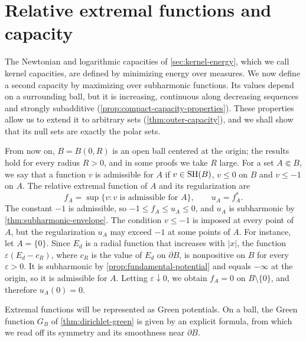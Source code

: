 \section{Relative extremal functions and capacity}
\label{sec:relative-capacity}
The Newtonian and logarithmic capacities of \cref{sec:kernel-energy}, which we call kernel capacities, are defined by minimizing energy over measures. We now define a second capacity by maximizing over subharmonic functions. Its values depend on a surrounding ball, but it is increasing, continuous along decreasing sequences and strongly subadditive (\cref{prop:compact-capacity-properties}). These properties allow us to extend it to arbitrary sets (\cref{thm:outer-capacity}), and we shall show that its null sets are exactly the polar sets.

From now on, $B=B(0,R)$ is an open ball centered at the origin; the results hold for every radius $R>0$, and in some proofs we take $R$ large. For a set $A\Subset B$, we say that a function $v$ is admissible for $A$ if $v\in\mathrm{SH}(B)$, $v\leq0$ on $B$ and $v\leq-1$ on $A$. The relative extremal function of $A$ and its regularization are
\[
 f_A=\sup\{v:v\text{ is admissible for }A\},\qquad u_A=f_A^*.
\]
The constant $-1$ is admissible, so $-1\leq f_A\leq u_A\leq0$, and $u_A$ is subharmonic by \cref{thm:subharmonic-envelope}. The condition $v\leq-1$ is imposed at every point of $A$, but the regularization $u_A$ may exceed $-1$ at some points of $A$. For instance, let $A=\{0\}$. Since $E_d$ is a radial function that increases with $|x|$, the function $\varepsilon(E_d-c_R)$, where $c_R$ is the value of $E_d$ on $\partial B$, is nonpositive on $B$ for every $\varepsilon>0$. It is subharmonic by \cref{prop:fundamental-potential} and equals $-\infty$ at the origin, so it is admissible for $A$. Letting $\varepsilon\downarrow0$, we obtain $f_A=0$ on $B\setminus\{0\}$, and therefore $u_A(0)=0$.

Extremal functions will be represented as Green potentials. On a ball, the Green function $G_B$ of \cref{thm:dirichlet-green} is given by an explicit formula, from which we read off its symmetry and its smoothness near $\partial B$.

